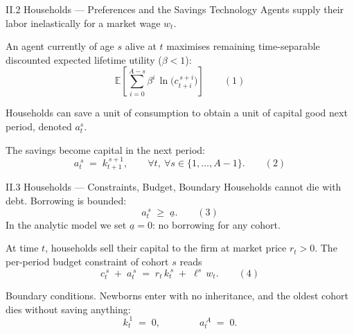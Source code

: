 \documentclass[aspectratio=169,11pt]{beamer}
\newcommand{\emphc}[1]{\textcolor{harvardcrimson}{#1}}
\newcommand{\E}[1]{\mathbb{E}\!\left[#1\right]}
\begin{document}
\begin{frame}{II.2 Households --- Preferences and the Savings Technology}
\small
Agents supply their labor \emphc{inelastically} for a market wage $w_t$.

\vspace{0.6em}
An agent \emphc{currently of age $s$} alive at $t$ maximises remaining time-separable discounted expected lifetime utility ($\beta < 1$):
\[
\E{\sum_{i=0}^{A-s} \beta^i \,\ln\!\bigl(c_{t+i}^{\,s+i}\bigr)} \qquad (1)
\]

\vspace{0.3em}
Households can save a unit of consumption to obtain a unit of capital good next period, denoted $a_t^s$.

\vspace{0.4em}
The savings become \emphc{capital in the next period}:
\[
a_t^{\,s} \;=\; k_{t+1}^{\,s+1}, \qquad \forall t,\ \forall s \in \{1, \ldots, A-1\}. \qquad (2)
\]
\end{frame}


\begin{frame}{II.3 Households --- Constraints, Budget, Boundary}
\small
Households \emphc{cannot die with debt}.  Borrowing is bounded:
\[
a_t^{\,s} \;\ge\; \underline{a}. \qquad (3)
\]
In the analytic model we set $\underline{a} = 0$: \emphc{no borrowing} for any cohort.

\vspace{0.4em}
At time $t$, households sell their capital to the firm at market price $r_t > 0$.  The per-period \emphc{budget constraint} of cohort $s$ reads
\[
c_t^{\,s} \;+\; a_t^{\,s} \;=\; r_t\, k_t^{\,s} \;+\; \ell^s\, w_t. \qquad (4)
\]

\vspace{0.4em}
\emphc{Boundary conditions.}  Newborns enter with no inheritance, and the oldest cohort dies without saving anything:
\[
k_t^{\,1} \;=\; 0, \qquad\qquad a_t^{\,A} \;=\; 0.
\]
\end{frame}
\end{document}
